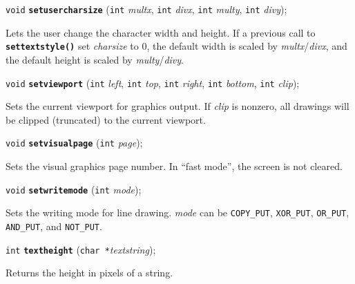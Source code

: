 \documentclass[a4paper,12pt]{article}
\newcommand{\V}{\texttt{void}}      %
\newcommand{\I}{\texttt{int}}       %
\newcommand{\C}{\texttt{char *}}    %
\newcommand{\func}[1]{\textbf{\texttt{#1}}}  %
\newcommand{\A}[1]{\emph{#1}}       %
\newcommand{\T}[1]{\texttt{#1}}     %
\newenvironment{bgi}
{ %
  \begin{snugshade}
}
{ %
  \end{snugshade}
}
\begin{document}
\begin{bgi}
\V{} \func{setusercharsize} (\I{} \A{multx}, \I{} \A{divx}, \I{}
\A{multy}, \I{} \A{divy});
\end{bgi}

Lets the user change the character width and height. If a previous
call to \func{settextsty\-le()} set \A{charsize} to 0, the default
width is scaled by \A{multx}/\A{divx}, and the default height is
scaled by \A{multy}/\A{divy}.


\label{sec:setviewport}

\begin{bgi}
\V{} \func{setviewport} (\I{} \A{left}, \I{} \A{top}, \I{} \A{right},
\I{} \A{bottom}, \I{} \A{clip});
\end{bgi}

Sets the current viewport for graphics output. If \A{clip} is nonzero,
all drawings will be clipped (truncated) to the current viewport.


\label{sec:setvisualpage}

\begin{bgi}
\V{} \func{setvisualpage} (\I{} \A{page});
\end{bgi}

Sets the visual graphics page number. In ``fast mode'', the screen is
not cleared.


\label{sec:setwritemode}

\begin{bgi}
\V{} \func{setwritemode} (\I{} \A{mode});
\end{bgi}

Sets the writing mode for line drawing. \A{mode} can be \T{COPY\_PUT},
\T{XOR\-\_PUT}, \T{OR\_PUT}, \T{AND\_PUT}, and \T{NOT\_PUT}.


\label{sec:textheight}

\begin{bgi}
\I{} \func{textheight} (\C{}\A{textstring});
\end{bgi}

Returns the height in pixels of a string.
\end{document}
